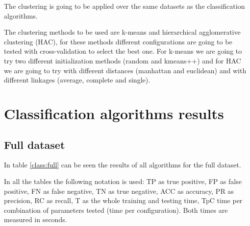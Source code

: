 \documentclass[a4paper,11pt]{article}
\begin{document}
The clustering is going to be applied over the same datasets as the classification algorithms.

The clustering methods to be used are k-means and hierarchical agglomerative clustering (HAC), for these methods different configurations are going to be tested with cross-validation to select the best one. For k-means we are going to try two different initialization methods (random and kmeans++) and for HAC we are going to try with different distances (manhattan and euclidean) and with different linkages (average, complete and single).

\section{Classification algorithms results}

\subsection{Full dataset}

In table \ref{class:full} can be seen the results of all algorithms for the full dataset.

In all the tables the following notation is used: TP as true positive, FP as false positive, FN as false negative, TN as true negative, ACC as accuracy, PR as precision, RC as recall, T as the whole training and testing time, TpC time per combination of parameters tested (time per configuration). Both times are measured in seconds.
\end{document}
